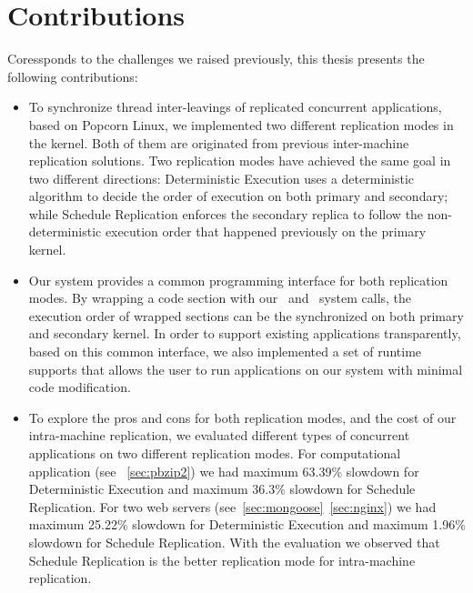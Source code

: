 \section{Contributions}

Coressponds to the challenges we raised previously, this thesis presents the following contributions:

\begin{itemize}
\item To synchronize thread inter-leavings of replicated concurrent applications, based on Popcorn Linux, we implemented two different replication modes in the kernel. Both of them are originated from previous inter-machine replication solutions. Two replication modes have achieved the same goal in two different directions: Deterministic Execution uses a deterministic algorithm to decide the order of execution on both primary and secondary; while Schedule Replication enforces the secondary replica to follow the non-deterministic execution order that happened previously on the primary kernel.

\item Our system provides a common programming interface for both replication modes. By wrapping a code section with our \detstart\ and \detend\ system calls, the execution order of wrapped sections can be the synchronized on both primary and secondary kernel. In order to support existing applications transparently, based on this common interface, we also implemented a set of runtime supports that allows the user to run applications on our system with minimal code modification.

\item To explore the pros and cons for both replication modes, and the cost of our intra-machine replication, we evaluated different types of concurrent applications on two different replication modes. For computational application (see ~\ref{sec:pbzip2}) we had maximum 63.39\%  slowdown for Deterministic Execution and maximum 36.3\% slowdown for Schedule Replication. For two web servers (see~\ref{sec:mongoose}~\ref{sec:nginx}) we had maximum 25.22\% slowdown for Deterministic Execution and maximum 1.96\% slowdown for Schedule Replication. With the evaluation we observed that Schedule Replication is the better replication mode for intra-machine replication.

\end{itemize}

